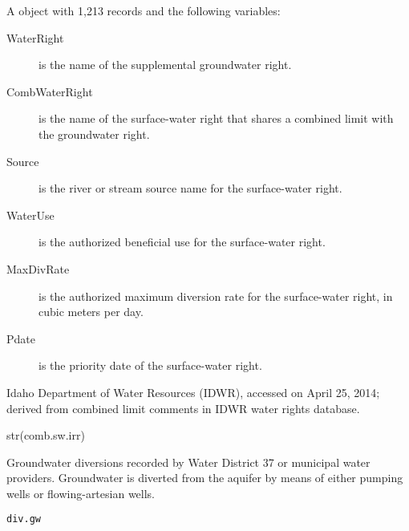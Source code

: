 \documentclass[letterpaper]{book}
\begin{document}
%
\begin{Format}
A  object with 1,213 records and the following variables:
\begin{description}

\item[WaterRight] is the name of the supplemental groundwater right.
\item[CombWaterRight] is the name of the surface-water right that shares a combined limit with the groundwater right.
\item[Source] is the river or stream source name for the surface-water right.
\item[WaterUse] is the authorized beneficial use for the surface-water right.
\item[MaxDivRate] is the authorized maximum diversion rate for the surface-water right, in cubic meters per day.
\item[Pdate] is the priority date of the surface-water right.

\end{description}

\end{Format}
%
\begin{Source}\relax
Idaho Department of Water Resources (IDWR), accessed on April 25, 2014;
derived from combined limit comments in IDWR water rights database.
\end{Source}
%
\begin{Examples}
\begin{ExampleCode}
str(comb.sw.irr)
\end{ExampleCode}
\end{Examples}
%
\begin{Description}\relax
Groundwater diversions recorded by Water District 37 or municipal water providers.
Groundwater is diverted from the aquifer by means of either pumping wells or flowing-artesian wells.
\end{Description}
%
\begin{Usage}
\begin{verbatim}
div.gw
\end{verbatim}
\end{Usage}
%
\end{document}
